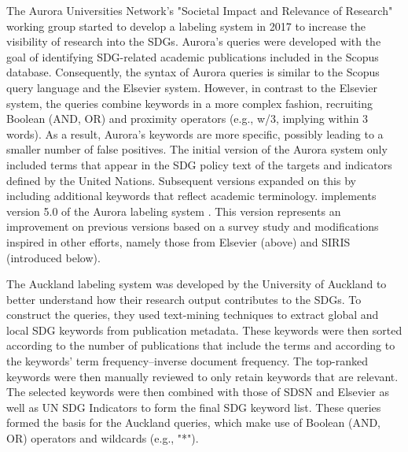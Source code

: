  The Aurora Universities Network's "Societal Impact and Relevance of Research" working group started to develop a labeling system in 2017 to increase the visibility of research into the SDGs. Aurora's queries were developed with the goal of identifying SDG-related academic publications included in the Scopus database. Consequently, the syntax of Aurora queries is similar to the Scopus query language and the Elsevier system. However, in contrast to the Elsevier system, the queries combine  keywords in a more complex fashion, recruiting Boolean (AND, OR) and proximity operators (e.g., w/3, implying within 3 words). As a result, Aurora's keywords are more specific, possibly leading to a smaller number of false positives. The initial version of the Aurora system only included terms that appear in the SDG policy text of the targets and indicators defined by the United Nations. Subsequent versions expanded on this by including additional keywords that reflect academic terminology.  implements version 5.0 of the Aurora labeling system \citep{vanderfeesten_maurice_2020_3817445}. This version represents an improvement on previous versions based on a survey study \citep{vanderfeesten_maurice_2020_3813230} and modifications inspired in other efforts, namely those from Elsevier (above) and SIRIS (introduced below).
 
 The Auckland labeling system \citep{wang2023mapping} was developed by the University of Auckland to better understand how their research output contributes to the SDGs. To construct the queries, they used text-mining techniques to extract global and local SDG keywords from publication metadata. These keywords were then sorted according to the number of publications that include the terms and according to the keywords' term frequency–inverse document frequency. The top-ranked keywords were then manually reviewed to only retain keywords that are relevant. The selected keywords were then combined with those of SDSN and Elsevier as well as UN SDG Indicators to form the final SDG keyword list. These queries formed the basis for the Auckland queries, which make use of Boolean (AND, OR) operators and wildcards (e.g., "*"). 

